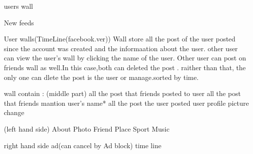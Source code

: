 users wall

New feeds

User walls(TimeLine(facebook.ver))
Wall store all the post of the user posted since the account was created and the
informaation about the user. other user can view the user's wall by clicking the
name of the user. Other user can post on friends wall as well.In this case,both
can deleted the post . raither than that, the only one can dlete the post is the
user or manage.sorted by time.

wall contain :
(middle part)
all the post that friends posted to user
all the post that friends mantion user's name*
all the post the user posted
user profile picture change

(left hand side)
About
Photo
Friend
Place
Sport
Music

right hand side
ad(can cancel by Ad block)
time line
